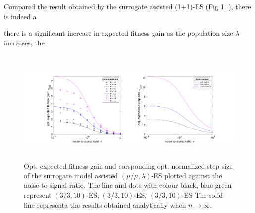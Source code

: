 
Compared the result obtained by the surrogate assisted (1+1)-ES (Fig 1. \cite{DBLP:conf/ppsn/KayhaniA18}), there is indeed a 

there is a significant increase in expected fitness gain as the population size $\lambda$ increases, the 




\begin{center}
\begin{figure}
\includegraphics[height=2.2in, width=6in]{opt_stepSize_fitGain_v1}
\caption{Opt. expected fitness gain and corsponding opt. normalized step size of the surrogate model assisted $(\mu/\mu,\lambda)$-ES plotted against the noise-to-signal ratio. The line and dots with colour black, blue green represent $(3/3,10)$-ES, $(3/3,10)$-ES, $(3/3,10)$-ES The solid line representa the results obtained analytically when $n\rightarrow \infty$. }
\label{fig:opt_stepSize_fitGain}
\end{figure}
\end{center}

